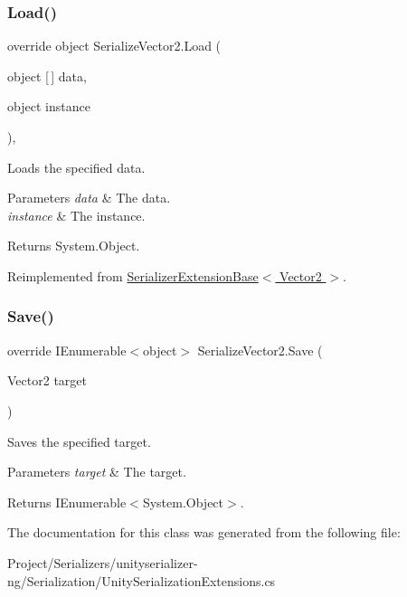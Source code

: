 \subsubsection{\texorpdfstring{Load()}{Load()}}
{\footnotesize\ttfamily override object Serialize\+Vector2.\+Load (\begin{DoxyParamCaption}\item[{object \mbox{[}$\,$\mbox{]}}]{data,  }\item[{object}]{instance }\end{DoxyParamCaption})\hspace{0.3cm}{\ttfamily [inline]}, {\ttfamily [virtual]}}



Loads the specified data. 


\begin{DoxyParams}{Parameters}
{\em data} & The data.\\
\hline
{\em instance} & The instance.\\
\hline
\end{DoxyParams}
\begin{DoxyReturn}{Returns}
System.\+Object.
\end{DoxyReturn}


Reimplemented from \hyperlink{class_serializer_extension_base_a3792a9b27056e30ca0ac91531936ae47}{Serializer\+Extension\+Base$<$ Vector2 $>$}.

\mbox{\label{class_serialize_vector2_afda6e3e96dc0d23c05983073104156cc}} 
\subsubsection{\texorpdfstring{Save()}{Save()}}
{\footnotesize\ttfamily override I\+Enumerable$<$object$>$ Serialize\+Vector2.\+Save (\begin{DoxyParamCaption}\item[{Vector2}]{target }\end{DoxyParamCaption})\hspace{0.3cm}{\ttfamily [inline]}}



Saves the specified target. 


\begin{DoxyParams}{Parameters}
{\em target} & The target.\\
\hline
\end{DoxyParams}
\begin{DoxyReturn}{Returns}
I\+Enumerable$<$System.\+Object$>$.
\end{DoxyReturn}


The documentation for this class was generated from the following file\+:\begin{DoxyCompactItemize}
\item 
Project/\+Serializers/unityserializer-\/ng/\+Serialization/Unity\+Serialization\+Extensions.\+cs\end{DoxyCompactItemize}
